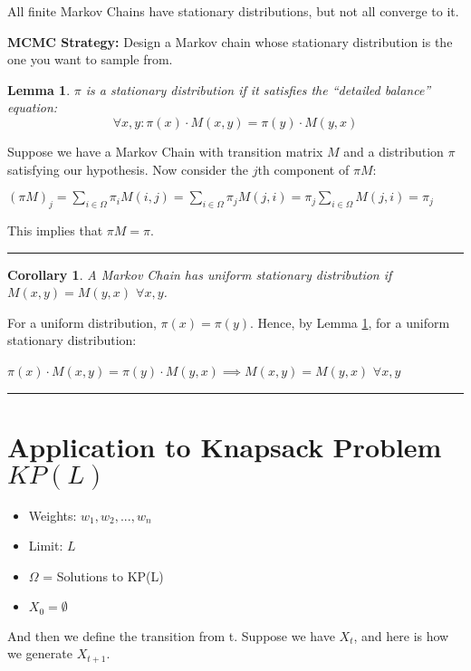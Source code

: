 \documentclass[twoside]{article}
\newtheorem{lemma}[theorem]{Lemma}
\newtheorem{corollary}[theorem]{Corollary}
\newenvironment{proof}{{\bf Proof:}}{\hfill\rule{2mm}{2mm}}
\begin{document}
All finite Markov Chains have stationary distributions, but not all converge to it.

\textbf{MCMC Strategy:}  Design a Markov chain whose stationary distribution is the one you want to sample from.

\begin{lemma}
\label{balance}
   $\pi$ is a stationary distribution if it satisfies the ``detailed balance'' equation:
   $$
   \forall x,y: \pi(x) \cdot M(x, y) = \pi(y) \cdot M(y, x)
   $$
\end{lemma}

\begin{proof}
Suppose we have a Markov Chain with transition matrix $M$ and a distribution $\pi$ satisfying our hypothesis. Now consider the $j$th component of $\pi M$:

$(\pi M)_j = \sum_{i \in \Omega} \pi_i M(i,j) = \sum_{i \in \Omega} \pi_j M(j, i) = \pi_j \sum_{i \in \Omega} M(j, i) = \pi_j$

This implies that $\pi M = \pi$.
\end{proof}

\begin{corollary}
\label{knapsack}
   A Markov Chain has uniform stationary distribution if $M(x, y) = M(y, x)$ $\forall x, y$.
\end{corollary}

\begin{proof}
   For a uniform distribution, $\pi(x) = \pi(y)$. Hence, by Lemma \ref{balance}, for a uniform stationary distribution:
   
   $\pi(x) \cdot M(x, y) = \pi(y) \cdot M(y, x) \implies M(x, y) = M(y, x)$  $\forall x, y$
\end{proof}




\section{Application to Knapsack Problem $KP(L)$}

\begin{itemize}
   \item Weights: $w_1,w_2, ..., w_n$
   \item Limit: $L$
   \item $\Omega$ = Solutions to KP(L)
   \item $X_0 = \emptyset$
\end{itemize}

And then we define the transition from t. Suppose we have $X_t$, and here is how we generate $X_{t+1}$.  
\end{document}
